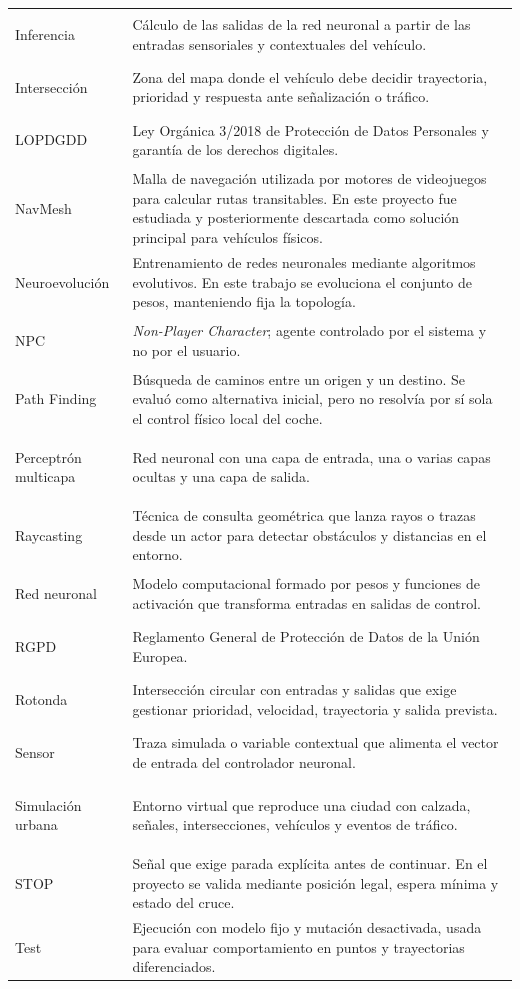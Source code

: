 \begin{longtable}{>{\bfseries\raggedright\arraybackslash}p{3.4cm}L{10.6cm}}
Inferencia & Cálculo de las salidas de la red neuronal a partir de las entradas sensoriales y contextuales del vehículo.\\
Intersección & Zona del mapa donde el vehículo debe decidir trayectoria, prioridad y respuesta ante señalización o tráfico.\\
LOPDGDD & Ley Orgánica 3/2018 de Protección de Datos Personales y garantía de los derechos digitales.\\
NavMesh & Malla de navegación utilizada por motores de videojuegos para calcular rutas transitables. En este proyecto fue estudiada y posteriormente descartada como solución principal para vehículos físicos.\\
Neuroevolución & Entrenamiento de redes neuronales mediante algoritmos evolutivos. En este trabajo se evoluciona el conjunto de pesos, manteniendo fija la topología.\\
NPC & \textit{Non-Player Character}; agente controlado por el sistema y no por el usuario.\\
Path Finding & Búsqueda de caminos entre un origen y un destino. Se evaluó como alternativa inicial, pero no resolvía por sí sola el control físico local del coche.\\
Perceptrón multicapa & Red neuronal con una capa de entrada, una o varias capas ocultas y una capa de salida.\\
Raycasting & Técnica de consulta geométrica que lanza rayos o trazas desde un actor para detectar obstáculos y distancias en el entorno.\\
Red neuronal & Modelo computacional formado por pesos y funciones de activación que transforma entradas en salidas de control.\\
RGPD & Reglamento General de Protección de Datos de la Unión Europea.\\
Rotonda & Intersección circular con entradas y salidas que exige gestionar prioridad, velocidad, trayectoria y salida prevista.\\
Sensor & Traza simulada o variable contextual que alimenta el vector de entrada del controlador neuronal.\\
Simulación urbana & Entorno virtual que reproduce una ciudad con calzada, señales, intersecciones, vehículos y eventos de tráfico.\\
STOP & Señal que exige parada explícita antes de continuar. En el proyecto se valida mediante posición legal, espera mínima y estado del cruce.\\
Test & Ejecución con modelo fijo y mutación desactivada, usada para evaluar comportamiento en puntos y trayectorias diferenciados.\\

\end{longtable}
